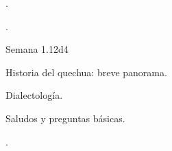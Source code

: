 \begin{syllabus}


\begin{justification}
.
\end{justification}

\begin{goals}
\item .
\end{goals}

\begin{outcomes}
    \item {} %
    \item {} %
    \item {} %
    \item {} %
\end{outcomes}

\begin{competences}
    \item {}
    \item {}
    \item {}
    \item {}
\end{competences}

\begin{unit}{Semana 1.}{}{}{12}{d4}
   \begin{topics}
      \item Historia del quechua: breve panorama.
      \item Dialectología.
      \item Saludos y preguntas básicas.
   \end{topics}

   \begin{learningoutcomes}
      \item .
   \end{learningoutcomes}
\end{unit}



\begin{coursebibliography}
\end{coursebibliography}

\end{syllabus}
